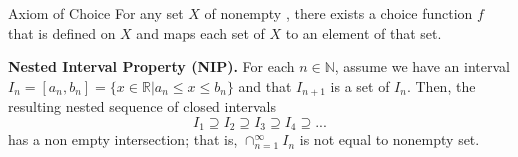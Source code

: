 \documentclass[11pt, a3paper, openany]{article}
\newcounter{Thm}[section]
\renewcommand{\theThm}{\arabic{section}.\arabic{Thm}}
\newenvironment{Thm}[1][]{
	\refstepcounter{Thm}
	\mdfsetup{
		frametitle={
			\tikz[baseline=(current bounding box.east), outer sep=0pt]
			\node[anchor=east,rectangle,fill=myblue]
			{\strut Theorem~\theThm\ifstrempty{#1}{}{:~#1}};},
		innertopmargin=10pt,linecolor=myblue,
		linewidth=2pt,topline=true,
		frametitleaboveskip=\dimexpr-\ht\strutbox\relax
	}
	\begin{mdframed}[]\relax
}{\end{mdframed}}
\theoremstyle{remark}
\theoremstyle{remark}
\theoremstyle{remark}
\newtheorem{claim}{\bfseries Claim}
\newenvironment{Proof of claim}
  {\begin{proof}[\normalfont \textbf{Proof of claim}]}
  {\end{proof}}
\begin{document}
\begin{Axiom}{Axiom of Choice}{}
    For any set $X$ of nonempty , there exists a choice function $f$ that is defined on $X$ and maps each set of $X$ to an element of that set.
\end{Axiom}
\begin{theorem}{}{}
\textbf{Nested Interval Property (NIP).} For each $n\in \mathbb{N}$, assume we have an interval $I_{n}=[a_{n}, b_{n}]=\{x \in \mathbb{R}|a_{n} \leq x \leq b_{n}\}$ and that $I_{n+1}$ is a set of $I_{n}$. Then, the resulting nested sequence of closed intervals
\begin{equation*}
    I_1 \supseteq I_2 \supseteq I_3 \supseteq I_4 \supseteq ...
\end{equation*}
has a non empty intersection; that is, $\cap_{n=1}^{\infty} I_{n}$ is not equal to nonempty set.

\end{theorem}
\end{document}
